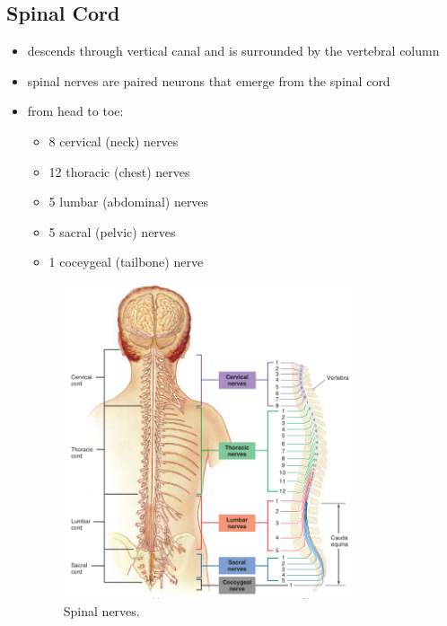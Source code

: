 \documentclass[10pt]{article}
\begin{document}
\subsection{Spinal Cord}
\begin{itemize}
    \item descends through vertical canal and is surrounded by the vertebral column
    \item spinal nerves are paired neurons that emerge from the spinal cord 
    \item from head to toe: 
        \begin{itemize}
            \item 8 cervical (neck) nerves
            \item 12 thoracic (chest) nerves
            \item 5 lumbar (abdominal) nerves
            \item 5 sacral (pelvic) nerves
            \item 1 coceygeal (tailbone) nerve
        \end{itemize}
        \begin{figure}[h]
            \centering
            \includegraphics[width=0.8\textwidth]{spinalNerves}
            \caption{Spinal nerves.}
            \label{fig:spinalNerves}
        \end{figure}
\end{itemize}
\end{document}
